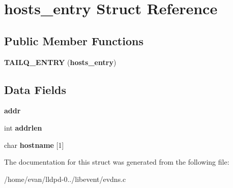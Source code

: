 \section{hosts\-\_\-entry \-Struct \-Reference}
\label{structhosts__entry}
\subsection*{\-Public \-Member \-Functions}
\begin{DoxyCompactItemize}
\item 
{\bfseries \-T\-A\-I\-L\-Q\-\_\-\-E\-N\-T\-R\-Y} ({\bf hosts\-\_\-entry})\label{structhosts__entry_a817c53988f91aa6a99b480d56b3aa976}

\end{DoxyCompactItemize}
\subsection*{\-Data \-Fields}
\begin{DoxyCompactItemize}
\item 
{\bfseries addr}\label{structhosts__entry_a747b15002d6c51d71476d634ae9ff1b2}

\item 
int {\bfseries addrlen}\label{structhosts__entry_a831741adfdfd6d071a62a5bc72ea1aeb}

\item 
char {\bfseries hostname} [1]\label{structhosts__entry_aaa711004f16e7ca9abc76eb5a67a4b66}

\end{DoxyCompactItemize}


\-The documentation for this struct was generated from the following file\-:\begin{DoxyCompactItemize}
\item 
/home/evan/lldpd-\/0../libevent/evdns.\-c\end{DoxyCompactItemize}
